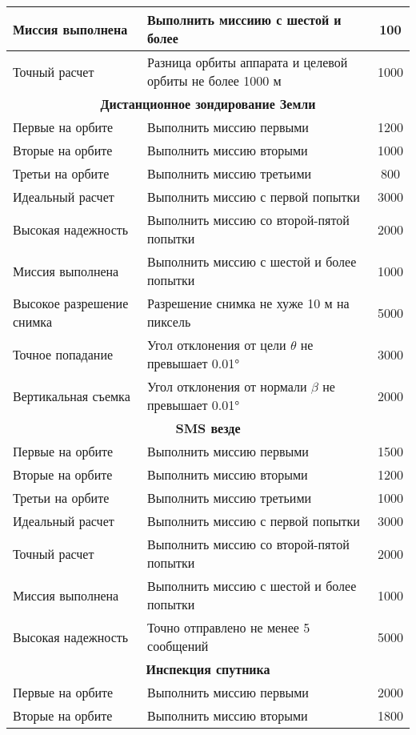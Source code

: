 \documentclass[12pt,a4paper]{article}
\begin{document}
\begin{center}
\begin{longtable}{ |p{5cm}|p{8cm}|c|}
  \hline
  Миссия выполнена & Выполнить миссиию с шестой и более & 100\\
  \hline
  Точный расчет & Разница орбиты аппарата и целевой орбиты не более 1000 м & 1000\\
  \hline
  \multicolumn{3}{|c|}{\textbf{Дистанционное зондирование Земли}}\\
  \hline
  Первые на орбите & Выполнить миссию первыми & 1200\\
  \hline
  Вторые на орбите & Выполнить миссию вторыми & 1000\\
  \hline
  Третьи на орбите & Выполнить миссию третьими & 800\\
  \hline
  Идеальный расчет & Выполнить миссию с первой попытки & 3000\\
  \hline
  Высокая надежность & Выполнить миссию со второй-пятой попытки & 2000\\
  \hline
  Миссия выполнена & Выполнить миссию с шестой и более попытки & 1000\\
  \hline
  Высокое разрешение снимка & Разрешение снимка не хуже 10 м на пиксель & 5000\\
  \hline
  Точное попадание & Угол отклонения от цели $\theta$ не превышает 0.01° & 3000\\
  \hline
  Вертикальная съемка & Угол отклонения от нормали $\beta$ не превышает 0.01° & 2000\\
  \hline
  \multicolumn{3}{|c|}{\textbf{SMS везде}}\\
  \hline
  Первые на орбите & Выполнить миссию первыми & 1500\\
  \hline
  Вторые на орбите & Выполнить миссию вторыми & 1200\\
  \hline
  Третьи на орбите & Выполнить миссию третьими & 1000\\
  \hline
  Идеальный расчет & Выполнить миссию с первой попытки & 3000\\
  \hline
  Точный расчет & Выполнить миссию со второй-пятой попытки & 2000\\
  \hline
  Миссия выполнена & Выполнить миссию с шестой и более попытки & 1000\\
  \hline
  Высокая надежность & Точно отправлено не менее 5 сообщений & 5000\\
  \hline
  \multicolumn{3}{|c|}{\textbf{Инспекция спутника}}\\
  \hline
  Первые на орбите & Выполнить миссию первыми & 2000\\
  \hline
  Вторые на орбите & Выполнить миссию вторыми & 1800\\

\end{longtable}
\end{center}
\end{document}
